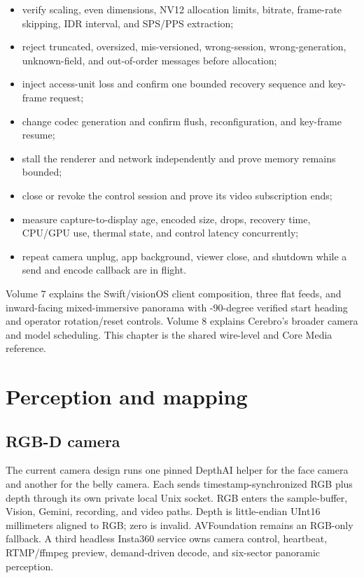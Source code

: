 \documentclass[10pt,openany]{book}
\begin{document}
\begin{itemize}
  \item verify scaling, even dimensions, NV12 allocation limits, bitrate, frame-rate skipping, IDR interval, and SPS/PPS extraction;
  \item reject truncated, oversized, mis-versioned, wrong-session, wrong-generation, unknown-field, and out-of-order messages before allocation;
  \item inject access-unit loss and confirm one bounded recovery sequence and key-frame request;
  \item change codec generation and confirm flush, reconfiguration, and key-frame resume;
  \item stall the renderer and network independently and prove memory remains bounded;
  \item close or revoke the control session and prove its video subscription ends;
  \item measure capture-to-display age, encoded size, drops, recovery time, CPU/GPU use, thermal state, and control latency concurrently;
  \item repeat camera unplug, app background, viewer close, and shutdown while a send and encode callback are in flight.
\end{itemize}

Volume 7 explains the Swift/visionOS client composition, three flat feeds, and inward-facing mixed-immersive panorama with -90-degree verified start heading and operator rotation/reset controls. Volume 8 explains Cerebro's broader camera and model scheduling. This chapter is the shared wire-level and Core Media reference.


\chapter{Perception and mapping}

\section{RGB-D camera}

\Experimental\quad The current camera design runs one pinned DepthAI helper for the face camera and another for the belly camera. Each sends timestamp-synchronized RGB plus depth through its own private local Unix socket. RGB enters the sample-buffer, Vision, Gemini, recording, and video paths. Depth is little-endian UInt16 millimeters aligned to RGB; zero is invalid. AVFoundation remains an RGB-only fallback. A third headless Insta360 service owns camera control, heartbeat, RTMP/ffmpeg preview, demand-driven decode, and six-sector panoramic perception.
\end{document}

